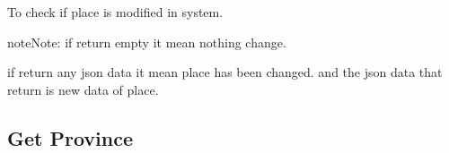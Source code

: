 \documentclass[letterpaper,10pt,english,openany,oneside]{sphinxmanual}
\begin{document}
\begin{fulllineitems}
\label{\detokenize{api/v4:get--api4-Places-isModify}}
\sphinxAtStartPar
To check if place is modified in system.

\begin{sphinxadmonition}{note}{Note:}
\sphinxAtStartPar
if return empty it mean nothing change.

\sphinxAtStartPar
if return any json data it mean place has been changed. and the json data that return is new data of place.
\end{sphinxadmonition}

\end{fulllineitems}



\subsection{Get Province}
\label{\detokenize{api/v4:get-province}}
\end{document}
